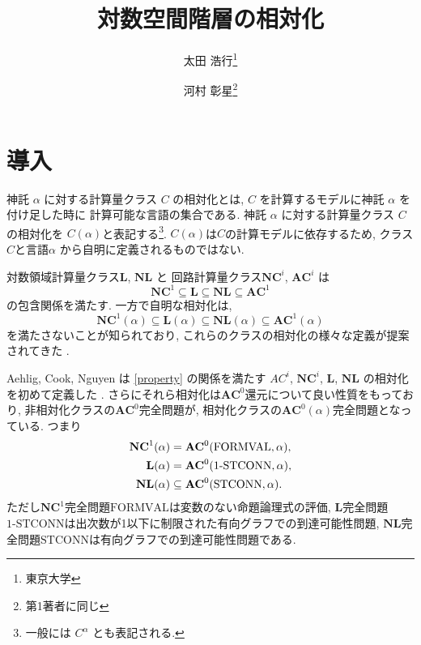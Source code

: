 \documentclass[10pt,a4paper,twocolumn]{jarticle}
\title{対数空間階層の相対化}
\author{太田 浩行\thanks{東京大学} \and
河村 彰星\thanks{第1著者に同じ}
}
\date{}
\theoremstyle{definition}
\theoremstyle{remark}
\newcommand{\classfont}{\mathbf}
\newcommand{\AC}{\classfont{AC}}
\newcommand{\NC}{\classfont{NC}}
\renewcommand{\L}{\classfont{L}}
\newcommand{\NL}{\classfont{NL}}
\newcommand{\probfont}{\text}
\newcommand{\oneSTCONN}{\probfont{1-STCONN}}
\newcommand{\STCONN}{\probfont{STCONN}}
\newcommand{\FORMVAL}{\probfont{FORMVAL}}
\begin{document}
\maketitle\thispagestyle{LAtitleheadings}



\section{導入}
神託 $\alpha$ に対する計算量クラス $C$ の相対化とは,
$C$ を計算するモデルに神託 $\alpha$ を付け足した時に
計算可能な言語の集合である.
神託 $\alpha$ に対する計算量クラス $C$ の相対化を
$C(\alpha)$と表記する\footnote{一般には $C^\alpha$ とも表記される.}.
$C(\alpha)$は$C$の計算モデルに依存するため, クラス$C$と言語$\alpha$
から自明に定義されるものではない.

対数領域計算量クラス$\L$, $\NL$ と
回路計算量クラス$\NC^i$, $\AC^i$ は
\begin{equation*}
 \NC^1 \subseteq \L \subseteq \NL \subseteq \AC^1
\end{equation*}
の包含関係を満たす.
一方で自明な相対化は,
\begin{equation}
 \NC^1(\alpha) \subseteq \L(\alpha) \subseteq \NL(\alpha) \subseteq \AC^1(\alpha) \label{property}
\end{equation}
を満たさないことが知られており,
これらのクラスの相対化の様々な定義が提案されてきた
\cite{aehlig2007relativizing,buss1988relativized,ladner1976relativization,wilson1988measure}.


Aehlig, Cook, Nguyen は \eqref{property} の関係を満たす
$AC^i$, $\NC^i$, $\L$, $\NL$ の相対化を初めて定義した
\cite{aehlig2007relativizing}.
さらにそれら相対化は$\AC^0$還元について良い性質をもっており,
非相対化クラスの$\AC^0$完全問題が,
相対化クラスの$\AC^0(\alpha)$完全問題となっている. つまり
\begin{align}
 \NC^1(\alpha) &= \AC^0 (\FORMVAL, \alpha), \notag
 \\
 \L(\alpha) &= \AC^0 (\oneSTCONN, \alpha), \label{eq:nl-in-ac0-stconn}
 \\
 \NL(\alpha) &\subseteq \AC^0(\STCONN, \alpha). \notag
\end{align}
ただし$\NC^1$完全問題$\FORMVAL$は変数のない命題論理式の評価,
$\L$完全問題$\oneSTCONN$は出次数が1以下に制限された有向グラフでの到達可能性問題,
$\NL$完全問題$\STCONN$は有向グラフでの到達可能性問題である.
\end{document}
